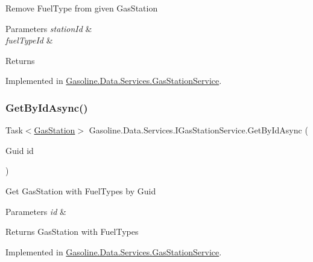 Remove Fuel\+Type from given Gas\+Station 


\begin{DoxyParams}{Parameters}
{\em station\+Id} & \\
\hline
{\em fuel\+Type\+Id} & \\
\hline
\end{DoxyParams}
\begin{DoxyReturn}{Returns}

\end{DoxyReturn}


Implemented in \mbox{\hyperlink{class_gasoline_1_1_data_1_1_services_1_1_gas_station_service_aced2362a8a06e2052178b96980c25b67}{Gasoline.\+Data.\+Services.\+Gas\+Station\+Service}}.

\mbox{\label{interface_gasoline_1_1_data_1_1_services_1_1_i_gas_station_service_addc95df8cbebea3094ad37655746bba2}} 
\subsubsection{\texorpdfstring{GetByIdAsync()}{GetByIdAsync()}}
{\footnotesize\ttfamily Task$<$\mbox{\hyperlink{class_gasoline_1_1_data_1_1_models_1_1_gas_station}{Gas\+Station}}$>$ Gasoline.\+Data.\+Services.\+I\+Gas\+Station\+Service.\+Get\+By\+Id\+Async (\begin{DoxyParamCaption}\item[{Guid}]{id }\end{DoxyParamCaption})}



Get Gas\+Station with Fuel\+Types by Guid 


\begin{DoxyParams}{Parameters}
{\em id} & \\
\hline
\end{DoxyParams}
\begin{DoxyReturn}{Returns}
Gas\+Station with Fuel\+Types
\end{DoxyReturn}


Implemented in \mbox{\hyperlink{class_gasoline_1_1_data_1_1_services_1_1_gas_station_service_a27d422e0840d24e1a45682f4dd293b7b}{Gasoline.\+Data.\+Services.\+Gas\+Station\+Service}}.

